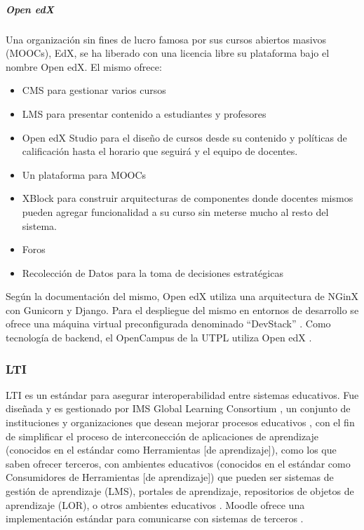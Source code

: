 \subparagraph{Open edX}
Una organización sin fines de lucro famosa por sus cursos abiertos masivos (MOOCs), EdX, se ha liberado con una licencia libre su plataforma bajo el nombre Open edX. El mismo ofrece:
\begin{itemize}
	\item CMS para gestionar varios cursos
    \item LMS  para presentar contenido a estudiantes y profesores
    \item Open edX Studio para el diseño de cursos desde su contenido y políticas de calificación hasta el horario que seguirá y el equipo de docentes.
    \item Un plataforma para MOOCs
    \item XBlock para construir arquitecturas de componentes donde docentes mismos pueden agregar funcionalidad a su curso sin meterse mucho al resto del sistema.
    \item Foros
    \item Recolección de Datos para la toma de decisiones estratégicas
\end{itemize}
Según la documentación del mismo, Open edX utiliza una arquitectura de NGinX con Gunicorn y Django. Para el despliegue del mismo en entornos de desarrollo se ofrece una máquina virtual preconfigurada denominado “DevStack” \citep{edX-About-Open-edX}. Como tecnología de backend, el OpenCampus de la UTPL utiliza Open edX \citep{Lopez-Jorge}.

\subsubsection{LTI}
LTI  es un estándar para asegurar interoperabilidad entre sistemas educativos. Fue diseñada y es gestionado por IMS Global Learning Consortium \citep{IMS-Global-LTI}, un conjunto de instituciones y organizaciones que desean mejorar procesos educativos \citep{IMS-Global-Members}, con el fin de simplificar el proceso de interconección de aplicaciones de aprendizaje (conocidos en el estándar como Herramientas [de aprendizaje]), como los que saben ofrecer terceros, con ambientes educativos (conocidos en el estándar como Consumidores de Herramientas [de aprendizaje]) que pueden ser sistemas de gestión de aprendizaje (LMS), portales de aprendizaje, repositorios de objetos de aprendizaje (LOR), o otros ambientes educativos \citep{IMS-Global-LTI}. Moodle ofrece una implementación estándar para comunicarse con sistemas de terceros \citep{MOODLE-DOCS-Features}.

